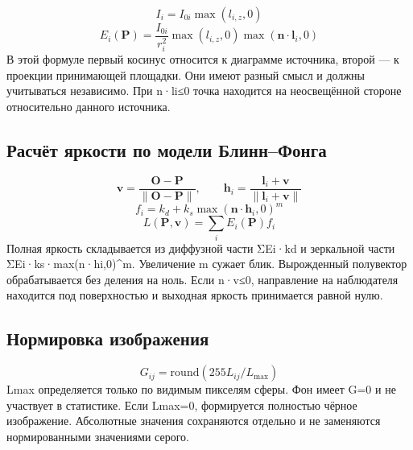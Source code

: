 \documentclass[a4paper,12pt]{article}
\begin{document}
\begin{equation}
I_i=I_{0i}\max(l_{i,z},0)
\end{equation}
\begin{equation}
E_i(\mathbf{P})=\frac{I_{0i}}{r_i^2}\max(l_{i,z},0)\max(\mathbf{n}\cdot\mathbf{l}_i,0)
\end{equation}
В этой формуле первый косинус относится к диаграмме источника, второй — к проекции принимающей площадки. Они имеют разный смысл и должны учитываться независимо. При n·li≤0 точка находится на неосвещённой стороне относительно данного источника.

\subsection{Расчёт яркости по модели Блинн–Фонга}
\begin{equation}
\mathbf{v}=\frac{\mathbf{O}-\mathbf{P}}{\|\mathbf{O}-\mathbf{P}\|},\qquad \mathbf{h}_i=\frac{\mathbf{l}_i+\mathbf{v}}{\|\mathbf{l}_i+\mathbf{v}\|}
\end{equation}
\begin{equation}
f_i=k_d+k_s\max(\mathbf{n}\cdot\mathbf{h}_i,0)^m
\end{equation}
\begin{equation}
L(\mathbf{P},\mathbf{v})=\sum_i E_i(\mathbf{P})f_i
\end{equation}
Полная яркость складывается из диффузной части ΣEi·kd и зеркальной части ΣEi·ks·max(n·hi,0)\textasciicircum{}m. Увеличение m сужает блик. Вырожденный полувектор обрабатывается без деления на ноль. Если n·v≤0, направление на наблюдателя находится под поверхностью и выходная яркость принимается равной нулю.

\subsection{Нормировка изображения}
\begin{equation}
G_{ij}=\mathrm{round}(255L_{ij}/L_{\max})
\end{equation}
Lmax определяется только по видимым пикселям сферы. Фон имеет G=0 и не участвует в статистике. Если Lmax=0, формируется полностью чёрное изображение. Абсолютные значения сохраняются отдельно и не заменяются нормированными значениями серого.

\clearpage
\end{document}
